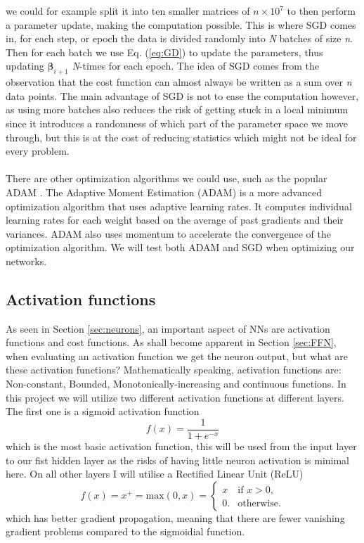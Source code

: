 \documentclass[12pt, a4paper]{book}
\begin{document}
we could for example split it into ten smaller matrices of $n\times10^7$ to then perform a parameter update, making the computation possible. This is where SGD comes in, for each step, or epoch the data is divided randomly into 
\textit{N} batches of size \textit{n}. Then for each batch we use Eq. (\ref{eq:GD}) to update the parameters, thus updating $\bm{\beta}_{i+1}$ \textit{N}-times for each epoch. The idea of SGD comes from the observation that the 
cost function can almost always be written as a sum over \textit{n} data points. The main advantage of SGD is not to ease the computation however, as using more batches also reduces the risk of getting stuck in a local minimum since it introduces a randomness of which part of the parameter space we move through, 
but this is at the cost of reducing statistics which might not be ideal for every problem.\\
\\There are other optimization algorithms we could use, such as the popular ADAM \cite{kingma2017adam}. The Adaptive Moment Estimation (ADAM) is a more advanced optimization algorithm that uses adaptive learning rates. It computes individual learning rates for each weight based on the average of past gradients 
and their variances. ADAM also uses momentum to accelerate the convergence of the optimization algorithm. We will test both ADAM and SGD when optimizing our networks.

\subsection{Activation functions}\label{sec:act}
As seen in Section \ref{sec:neurons}, an important aspect of NNs are activation functions and cost functions. As shall become apparent in Section \ref{sec:FFN}, when evaluating an activation function we get the neuron output, but what are these activation functions? 
Mathematically speaking, activation functions are: Non-constant, Bounded, Monotonically-increasing and continuous functions. In this project we will utilize two different activation functions at different layers. 
The first one is a sigmoid activation function
\begin{equation}\label{eq:sig}
    f(x) = \frac{1}{1+e^{-x}}
\end{equation}
which is the most basic activation function, this will be used from the input layer to our fist hidden layer as the risks of having little neuron activation is minimal here. On all other layers I will utilise a Rectified Linear Unit (ReLU)
\begin{equation}\label{eq:ReLU}
    f(x) = x^+ = \text{max}(0,x) = \begin{cases}x&{\text{if }}x>0,\\0.&{\text{otherwise}}.\end{cases}
\end{equation}
which has better gradient propagation, meaning that there are fewer vanishing gradient problems compared to the sigmoidial function.
\end{document}
